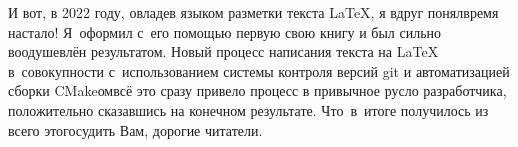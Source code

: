 {И вот, в 2022 году, овладев языком разметки текста \LaTeX{}, я вдруг понял\mdash время настало! Я~оформил с~его помощью первую свою книгу и был сильно воодушевлён результатом. Новый процесс написания текста на \LaTeX{} в~совокупности с~использованием системы контроля версий git и автоматизацией сборки CMake\sdash ом\mdash всё это сразу привело процесс в привычное русло разработчика, положительно сказавшись на конечном результате. Что~в~итоге получилось из всего этого\mdash судить Вам, дорогие читатели.
}
